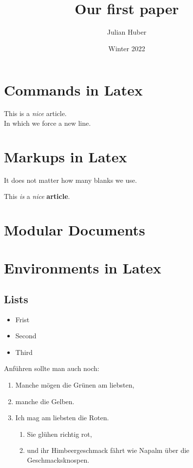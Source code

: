 \documentclass{scrartcl}
\begin{document}
	
\title{Our first paper}
\author{Julian Huber}
\date{Winter 2022}
\maketitle

\abstract{\blindtext}

\tableofcontents


\section{Commands in Latex}

This is a \emph{nice} article. \\ In which we force a new line.


\section{Markups in Latex}


It      does        not     matter      how     many    blanks   we     use. 	

This \textit{is} a \emph{nice} \textbf{article}.


\section{Modular Documents}




\section{Environments in Latex}


\subsection{Lists}

\begin{itemize}
	\item Frist
	\item Second
	\item Third
\end{itemize}

Anführen sollte man auch noch:
\begin{enumerate}
	\item Manche mögen die Grünen am liebsten,
	\item manche die Gelben.
	\item Ich mag am liebsten die Roten.
	\begin{enumerate}
		\item Sie glühen richtig rot,
		\item und ihr Himbeergeschmack fährt wie Napalm über
		die Geschmacksknospen.
	\end{enumerate}
\end{enumerate}
\end{document}
